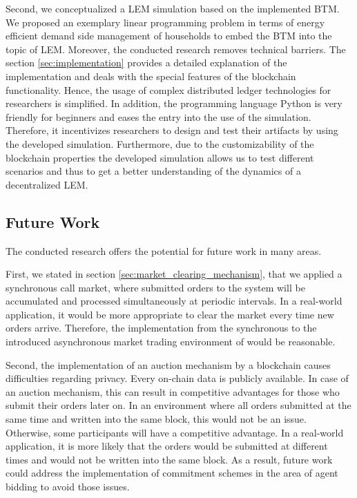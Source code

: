 Second, we conceptualized a LEM simulation based on the implemented
BTM. We proposed an exemplary linear programming problem in terms of energy efficient demand side management of households to embed the BTM into the topic of LEM.
Moreover, the conducted research removes technical barriers.
The section \ref{sec:implementation} provides a detailed 
explanation of the implementation and deals with the special features 
of the blockchain functionality.
Hence, the usage of complex distributed ledger technologies for researchers
is simplified. 
In addition, the programming language Python is very 
friendly for beginners and eases the entry into the use of the simulation.
Therefore, it incentivizes researchers 
to design and test their artifacts by using the developed simulation.
Furthermore, due to the customizability of the blockchain properties 
the developed simulation allows us to test different scenarios and thus 
to get a better understanding of the dynamics of a decentralized LEM.

\subsection{Future Work}
The conducted research offers the potential for future work in many areas.

First, we stated in section \ref{sec:market_clearing_mechanism}, that we
applied a synchronous call market, where submitted orders to the system
will be accumulated and processed simultaneously at periodic intervals.
In a real-world application, it would be more appropriate to clear the market every time new orders arrive. Therefore,
the implementation from the synchronous to the introduced asynchronous market trading environment of  would be reasonable. 

Second, the implementation of an auction mechanism by a blockchain causes difficulties regarding privacy. Every on-chain data is publicly available. 
In case of an auction mechanism, this can result in competitive advantages
for those who submit their orders later on. 
In an environment where all orders submitted at the same time and written into the same block, this would not be an issue. 
Otherwise, some participants will have a competitive advantage.
In a real-world application, it is more likely that the orders would be submitted at different
times and would not be written into the same block. 
As a result, future work could address the implementation of commitment schemes
in the area of agent bidding to avoid those issues.

